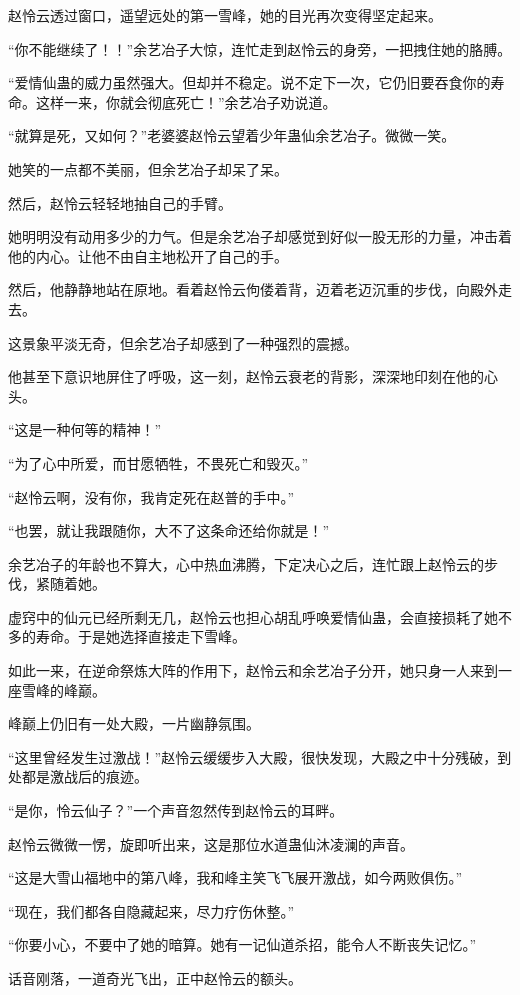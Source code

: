 \begin{this_body}
赵怜云透过窗口，遥望远处的第一雪峰，她的目光再次变得坚定起来。

“你不能继续了！！”余艺冶子大惊，连忙走到赵怜云的身旁，一把拽住她的胳膊。

“爱情仙蛊的威力虽然强大。但却并不稳定。说不定下一次，它仍旧要吞食你的寿命。这样一来，你就会彻底死亡！”余艺冶子劝说道。

“就算是死，又如何？”老婆婆赵怜云望着少年蛊仙余艺冶子。微微一笑。

她笑的一点都不美丽，但余艺冶子却呆了呆。

然后，赵怜云轻轻地抽自己的手臂。

她明明没有动用多少的力气。但是余艺冶子却感觉到好似一股无形的力量，冲击着他的内心。让他不由自主地松开了自己的手。

然后，他静静地站在原地。看着赵怜云佝偻着背，迈着老迈沉重的步伐，向殿外走去。

这景象平淡无奇，但余艺冶子却感到了一种强烈的震撼。

他甚至下意识地屏住了呼吸，这一刻，赵怜云衰老的背影，深深地印刻在他的心头。

“这是一种何等的精神！”

“为了心中所爱，而甘愿牺牲，不畏死亡和毁灭。”

“赵怜云啊，没有你，我肯定死在赵普的手中。”

“也罢，就让我跟随你，大不了这条命还给你就是！”

余艺冶子的年龄也不算大，心中热血沸腾，下定决心之后，连忙跟上赵怜云的步伐，紧随着她。

虚窍中的仙元已经所剩无几，赵怜云也担心胡乱呼唤爱情仙蛊，会直接损耗了她不多的寿命。于是她选择直接走下雪峰。

如此一来，在逆命祭炼大阵的作用下，赵怜云和余艺冶子分开，她只身一人来到一座雪峰的峰巅。

峰巅上仍旧有一处大殿，一片幽静氛围。

“这里曾经发生过激战！”赵怜云缓缓步入大殿，很快发现，大殿之中十分残破，到处都是激战后的痕迹。

“是你，怜云仙子？”一个声音忽然传到赵怜云的耳畔。

赵怜云微微一愣，旋即听出来，这是那位水道蛊仙沐凌澜的声音。

“这是大雪山福地中的第八峰，我和峰主笑飞飞展开激战，如今两败俱伤。”

“现在，我们都各自隐藏起来，尽力疗伤休整。”

“你要小心，不要中了她的暗算。她有一记仙道杀招，能令人不断丧失记忆。”

话音刚落，一道奇光飞出，正中赵怜云的额头。


\end{this_body}
